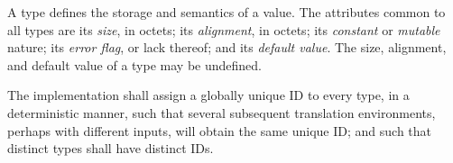 
\begin{grammar}

 \\
	 \optional{\terminal{!}}  \\

 \\
	 \\
	 \\
	 \\
	 \\
	 \\
	 \\
	 \\
	 \\
	 \\

 \\
	 \\
	 \\
	 \\
	 \\
	 \\
	 \\
	 \\
	 \\
	 \\
\end{grammar}

\specsubitem
A type defines the storage and semantics of a value. The attributes common to
all types are its \textit{size}, in octets; its \textit{alignment}, in octets;
its \textit{constant} or \textit{mutable} nature; its \textit{error flag}, or
lack thereof; and its \textit{default value}. The size, alignment, and default
value of a type may be undefined.

\specsubitem
The implementation shall assign a globally unique ID to every type, in a
deterministic manner, such that several subsequent translation environments,
perhaps with different inputs, will obtain the same unique ID; and such that
distinct types shall have distinct IDs.

